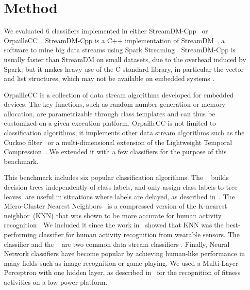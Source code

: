 \section{Method}
We evaluated 6 classifiers implemented in
either StreamDM-Cpp~\cite{StreamDM-CPP} or
OrpailleCC~\cite{OrpailleCC}.  StreamDM-Cpp is a
C++ implementation of StreamDM~\cite{StreamDM}, a
software to mine big data streams using Spark
Streaming . StreamDM-Cpp is usually faster than
StreamDM on small datasets, due to
the overhead induced by Spark, but it makes heavy
use of the C standard library, in particular the vector and
list structures, which may not be available on embedded systems
 .

OrpailleCC is a
collection of data stream algorithms developed for embedded devices. The key
functions, such as random number generation or memory allocation, are
parametrizable through class templates and can thus be customized 
on a given execution platform.
OrpailleCC is not limited to classification
algorithms, it implements other data stream
algorithms such as the Cuckoo filter~\cite{cuckoo}
or a multi-dimensional extension of the
Lightweight Temporal Compression~\cite{multi-ltc}. We extended it with 
a few classifiers for the purpose of this benchmark.

This benchmark includes six popular classification
algorithms.  The \mondrianforest~\cite{mondrian2014} builds decision trees independently of class labels,
and only assign class labels to tree leaves. \mondrianforest are useful in
situations where labels are delayed, as described
in~\cite{stream_learning_review}.  The Micro-Cluster Nearest
Neighbors~\cite{mc-nn} is a compressed version of the K-nearest
neighbor~(KNN) that was shown to be more accurate for human activity
recognition . We included
it since the work in~\cite{Janidarmian_2017} showed that KNN was the
best-performing classifier for human activity recognition from wearable
sensors.  The \naivebayes~\cite{naive_bayes} classifier
and the \hoeffdingtree~\cite{VFDT} are two common data stream classifiers .
Finally, Neural Network classifiers have
become popular by achieving human-like performance in many fields such as image
recognition or game playing. We used a
Multi-Layer Perceptron with one hidden layer, as described in~\cite{omid_2019} for the recognition 
of fitness activities on a low-power platform.



